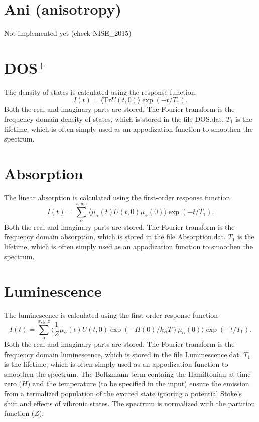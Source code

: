\section{Ani (anisotropy)}
Not implemented yet (check NISE\_2015)
\section{DOS$^{+}$}
The density of states is calculated using the response function:
\begin{equation}
	I(t)=\langle\textrm{Tr}U(t,0)\rangle\exp(-t/T_1).
\end{equation}
Both the real and imaginary parts are stored. The Fourier transform is the frequency domain density of states, which is stored in the file DOS.dat. $T_1$ is the lifetime, which is often simply used as an appodization function to smoothen the spectrum.
\section{Absorption}
The linear absorption is calculated using the first-order response function \cite{Duan_2015}
\begin{equation}
	I(t)=\sum_{\alpha}^{x,y,z}\langle\mu_{\alpha}(t)U(t,0)\mu_{\alpha}(0)\rangle\exp(-t/T_1).
\end{equation}
Both the real and imaginary parts are stored. The Fourier transform is the frequency domain absorption, which is stored in the file Absorption.dat. $T_1$ is the lifetime, which is often simply used as an appodization function to smoothen the spectrum. 
\section{Luminescence}
The luminescence is calculated using the first-order response function
\begin{equation}
	I(t)=\sum_{\alpha}^{x,y,z}\langle\frac{1}{Z}\mu_{\alpha}(t)U(t,0)\exp(-H(0)/k_BT)\mu_{\alpha}(0)\rangle\exp(-t/T_1).
\end{equation}
Both the real and imaginary parts are stored. The Fourier transform is the frequency domain luminescence, which is stored in the file Luminescence.dat. $T_1$ is the lifetime, which is often simply used as an appodization function to smoothen the spectrum. The Boltzmann term containg the Hamiltonian at time zero ($H$) and the temperature (to be specified in the input) ensure the emission from a termalized population of the excited state ignoring a potential Stoke's shift and effects of vibronic states. The spectrum is normalized with the partition function ($Z$). 
